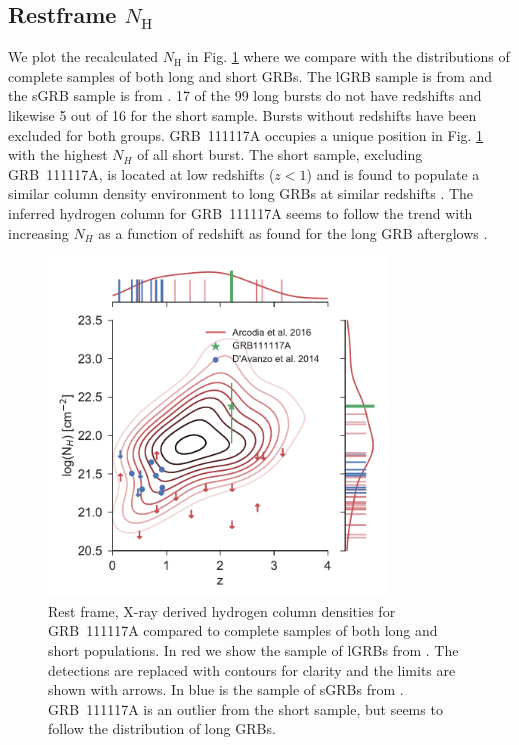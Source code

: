 \documentclass{aa}    %
\begin{document}
\subsection{Restframe $N_\mathrm{H}$} \label{restnH}

We plot the recalculated $N_\mathrm{H}$ in Fig. \ref{fig:NH_z} where we compare with the
distributions of complete samples of both long and short GRBs. The lGRB sample
is from \citet{Arcodia2016} and the sGRB sample is from \citet{DAvanzo2014a}.
17 of the 99 long bursts do not have redshifts and likewise 5 out of 16 for
the short sample. Bursts without redshifts have been excluded for both groups.
GRB~111117A occupies a unique position in Fig. \ref{fig:NH_z} with the highest
$N_H$ of all short burst. The short sample, excluding GRB~111117A, is located at
low redshifts ($z < 1$) and is found to populate a similar column density
environment to long GRBs at similar redshifts \citep{DAvanzo2014a}. The inferred
hydrogen column for GRB~111117A seems to follow the trend with increasing $N_H$
as a function of redshift as found for the long GRB afterglows \citep{Arcodia2016}.

\begin{figure}
	\centering
	\includegraphics[width=9cm]{figures/NH_z.pdf}
	\caption{Rest frame, X-ray derived hydrogen column densities for GRB~111117A compared to complete samples of both long and short populations. In red we show the sample of lGRBs from \citet{Arcodia2016}. The detections are replaced with contours for clarity and the limits are shown with arrows. In blue is the sample of sGRBs from \citet{DAvanzo2014a}. GRB~111117A is an outlier from the short sample, but seems to follow the distribution of long GRBs.}
	\label{fig:NH_z}
\end{figure}
\end{document}
